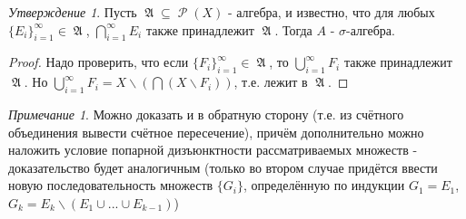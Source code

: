 \documentclass[a4paper]{article}
\theoremstyle{indented}
\theoremstyle{definition}
\theoremstyle{remark}
\newtheorem{remark}{Примечание}
\newtheorem{stat}{Утверждение}
\DeclareMathOperator{\GA}{\mathfrak{A}}
\DeclareMathOperator{\Rho}{\mathcal{P}}
\begin{document}
\begin{stat}
Пусть $\GA \subseteq \Rho(X)$ - алгебра, и известно, что для любых $\{E_i\}_{i=1}^{\infty} \in \GA$, $\bigcap_{i=1}^{\infty} E_i$ также принадлежит $\GA$. Тогда $A$ - $\sigma$-алгебра. 
\end{stat}
\begin{proof}
Надо проверить, что если $\{F_i\}_{i=1}^{\infty} \in \GA$, то $\bigcup_{i=1}^{\infty} F_i$ также принадлежит $\GA$. Но $\bigcup_{i=1}^{\infty} F_i = X \backslash (\bigcap (X \backslash F_i))$, т.е. лежит в $\GA$.
\end{proof}
\begin{remark}
Можно доказать и в обратную сторону (т.е. из счётного объединения вывести счётное пересечение), причём дополнительно можно наложить условие попарной дизъюнктности рассматриваемых множеств - доказательство будет аналогичным (только во втором случае придётся ввести новую последовательность множеств $\{G_i\}$, определённую по индукции $G_1=E_1$, $G_k=E_k \backslash (E_1 \cup ... \cup E_{k-1})$)
\end{remark}
\end{document}

